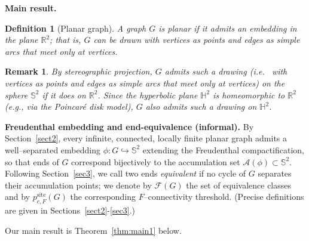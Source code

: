 \documentclass[11pt]{amsart}
\theoremstyle{plain}
\newtheorem{definition}[theorem]{Definition}
\newtheorem{remark}[theorem]{Remark}
\numberwithin{equation}{section}
\numberwithin{figure}{section}
\newcommand\RR{{\mathbb R}}
\newcommand\HH{{\mathbb H}}
\begin{document}
\medskip
\noindent\textbf{Main result.}
\begin{definition}[Planar graph]
A graph \(G\) is \emph{planar} if it admits an embedding in the plane \(\RR^{2}\); that is, \(G\) can be drawn
with vertices as points and edges as simple arcs that meet only at vertices.
\end{definition}


\begin{remark}
By stereographic projection, \(G\) admits such a drawing (i.e.~ with vertices as points and edges as simple arcs that meet only at vertices) on the sphere \(\mathbb{S}^{2}\) if it does on
\(\RR^{2}\). Since the hyperbolic plane \(\HH^{2}\) is homeomorphic to \(\RR^{2}\) (e.g., via the Poincaré disk model),
\(G\) also admits such a drawing on \(\HH^{2}\).
\end{remark}

\noindent\textbf{Freudenthal embedding and end-equivalence (informal).}
By Section~\ref{sect2}, every infinite, connected, locally finite planar graph admits a
well--separated embedding $\phi:G\hookrightarrow\mathbb S^2$ extending the Freudenthal compactification,
so that ends of $G$ correspond bijectively to the accumulation set $\mathcal{A}(\phi)\subset\mathbb S^2$.
Following Section~\ref{sec3}, we call two ends \emph{equivalent} if no cycle of $G$ separates
their accumulation points; we denote by $\mathcal F(G)$ the set of equivalence classes and
by $p^{\mathrm{site}}_{c,F}(G)$ the corresponding $F$--connectivity threshold.
(Precise definitions are given in Sections~\ref{sect2}-\ref{sec3}.)


Our main result is Theorem~\ref{thm:main1} below. 
\end{document}
